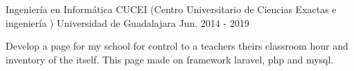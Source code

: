 \begin{cventries}
	\cventry
	{Ingeniería en Informática}
	{CUCEI (Centro Universitario de Ciencias Exactas e ingeniería )}
	{Universidad de Guadalajara }
	{Jun. 2014 - 2019 }
	{
		\begin{cvitems}
			\item {Develop a page for my school for control to a teachers theirs  classroom hour and inventory of the itself. This page  made on framework laravel, php and mysql.}
		\end{cvitems}
	}
\end{cventries}
